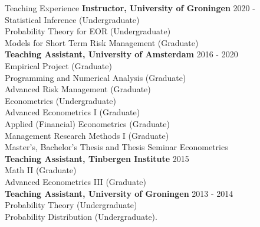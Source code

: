 \documentclass{resume} %
\begin{document}
\begin{rSection}{Teaching Experience}
	\textbf{Instructor, 	University of Groningen}
 \hfill 2020 - ~~~~~~ \\
	Statistical Inference (Undergraduate) \\	
	Probability Theory for EOR (Undergraduate) \\
	Models for Short Term Risk Management (Graduate) \\
	
	\textbf{Teaching Assistant, University of Amsterdam} \hfill 2016 - 2020 \\ 
Empirical Project (Graduate)\\
Programming and Numerical Analysis (Graduate)\\
Advanced Risk Management (Graduate)\\
Econometrics (Undergraduate)\\
Advanced Econometrics I (Graduate)\\ 
Applied (Financial) Econometrics (Graduate)\\
Management Research Methods I (Graduate)\\
	Master's, Bachelor’s Thesis and Thesis Seminar Econometrics \\
	
\textbf{Teaching Assistant, Tinbergen Institute} \hfill 2015 ~~~~~~~~ \\ 
	Math II (Graduate)\\
	Advanced Econometrics III (Graduate)\\
	
\textbf{Teaching Assistant, University of Groningen}\hfill	
	2013 - 2014  \\
	Probability Theory (Undergraduate)\\
	Probability Distribution (Undergraduate).
\end{rSection}


	 
\end{document}
